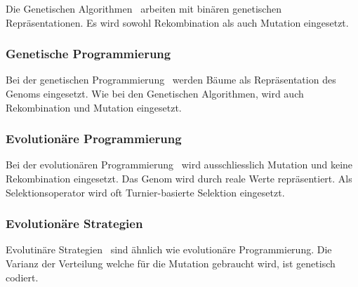       Die Genetischen Algorithmen~\cite{book:adapNaturalArtSys} arbeiten mit binären genetischen Repräsentationen.
      Es wird sowohl Rekombination als auch Mutation eingesetzt.

    \subsubsection{Genetische Programmierung\label{item:genProg}}

      Bei der genetischen Programmierung~\cite{book:genProg} werden Bäume als Repräsentation des Genoms eingesetzt. Wie bei den Genetischen Algorithmen,
      wird auch Rekombination und Mutation eingesetzt.

    \subsubsection{Evolutionäre Programmierung\label{item:evProg}}

      Bei der evolutionären Programmierung~\cite{book:artIntSimEv} wird ausschliesslich Mutation und keine Rekombination eingesetzt.
      Das Genom wird durch reale Werte repräsentiert. Als Selektionsoperator wird oft Turnier-basierte Selektion eingesetzt.

    \subsubsection{Evolutionäre Strategien\label{item:evStrat}}

      Evolutinäre Strategien~\cite{book:evStrat} sind ähnlich wie evolutionäre Programmierung.
      Die Varianz der Verteilung welche für die Mutation gebraucht wird, ist genetisch codiert.
